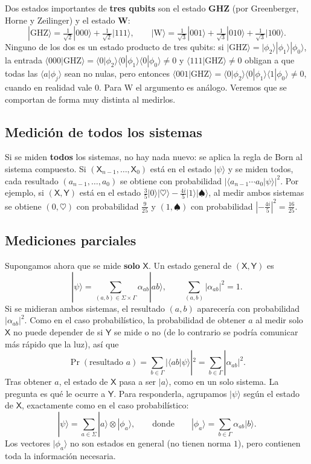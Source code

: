 \documentclass[11pt, a4paper, twoside, openright]{report}
\begin{document}
\noindent Dos estados importantes de \textbf{tres qubits} son el estado \textbf{GHZ} (por Greenberger, Horne y Zeilinger) y el estado \textbf{W}:
\[ |\mathrm{GHZ}\rangle = \tfrac{1}{\sqrt2}|000\rangle + \tfrac{1}{\sqrt2}|111\rangle, \qquad |\mathrm{W}\rangle = \tfrac{1}{\sqrt3}|001\rangle + \tfrac{1}{\sqrt3}|010\rangle + \tfrac{1}{\sqrt3}|100\rangle. \]
Ninguno de los dos es un estado producto de tres qubits: si $|\mathrm{GHZ}\rangle = |\phi_2\rangle|\phi_1\rangle|\phi_0\rangle$, la entrada $\langle 000|\mathrm{GHZ}\rangle = \langle0|\phi_2\rangle\langle0|\phi_1\rangle\langle0|\phi_0\rangle \neq 0$ y $\langle111|\mathrm{GHZ}\rangle \neq 0$ obligan a que todas las $\langle a|\phi_j\rangle$ sean no nulas, pero entonces $\langle 001|\mathrm{GHZ}\rangle = \langle0|\phi_2\rangle\langle0|\phi_1\rangle\langle1|\phi_0\rangle \neq 0$, cuando en realidad vale $0$. Para W el argumento es análogo. Veremos que se comportan de forma muy distinta al medirlos.

\subsection{Medición de todos los sistemas}

\noindent Si se miden \textbf{todos} los sistemas, no hay nada nuevo: se aplica la regla de Born al sistema compuesto. Si $(\mathsf{X}_{n-1},\dots,\mathsf{X}_0)$ está en el estado $|\psi\rangle$ y se miden todos, cada resultado $(a_{n-1},\dots,a_0)$ se obtiene con probabilidad $|\langle a_{n-1}\cdots a_0|\psi\rangle|^2$. Por ejemplo, si $(\mathsf{X},\mathsf{Y})$ está en el estado $\frac35|0\rangle|\heartsuit\rangle - \frac{4i}{5}|1\rangle|\spadesuit\rangle$, al medir ambos sistemas se obtiene $(0,\heartsuit)$ con probabilidad $\frac{9}{25}$ y $(1,\spadesuit)$ con probabilidad $\left|-\frac{4i}{5}\right|^2 = \frac{16}{25}$.

\subsection{Mediciones parciales}

\noindent Supongamos ahora que se mide \textbf{solo} $\mathsf{X}$. Un estado general de $(\mathsf{X},\mathsf{Y})$ es
\[ |\psi\rangle = \sum_{(a,b)\in\Sigma\times\Gamma}\alpha_{ab}|ab\rangle, \qquad \sum_{(a,b)}|\alpha_{ab}|^2 = 1. \]
Si se midieran ambos sistemas, el resultado $(a,b)$ aparecería con probabilidad $|\alpha_{ab}|^2$. Como en el caso probabilístico, la probabilidad de obtener $a$ al medir solo $\mathsf{X}$ no puede depender de si $\mathsf{Y}$ se mide o no (de lo contrario se podría comunicar más rápido que la luz), así que
\[ \Pr(\text{resultado } a) = \sum_{b\in\Gamma}|\langle ab|\psi\rangle|^2 = \sum_{b\in\Gamma}|\alpha_{ab}|^2. \]
Tras obtener $a$, el estado de $\mathsf{X}$ pasa a ser $|a\rangle$, como en un solo sistema. La pregunta es qué le ocurre a $\mathsf{Y}$. Para responderla, agrupamos $|\psi\rangle$ según el estado de $\mathsf{X}$, exactamente como en el caso probabilístico:
\[ |\psi\rangle = \sum_{a\in\Sigma}|a\rangle\otimes|\phi_a\rangle, \qquad \text{donde} \qquad |\phi_a\rangle = \sum_{b\in\Gamma}\alpha_{ab}|b\rangle. \]
Los vectores $|\phi_a\rangle$ no son estados en general (no tienen norma $1$), pero contienen toda la información necesaria.
\end{document}
